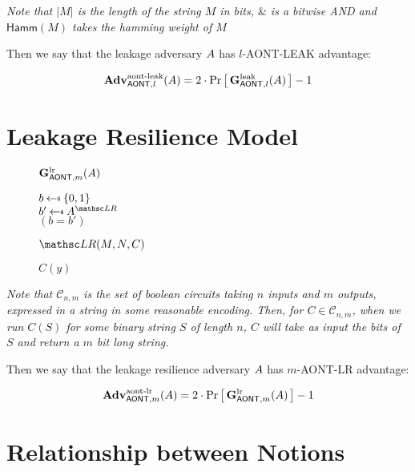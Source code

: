 \documentclass[11pt,twoside]{article}
\begin{document}
\emph{Note that $|M|$ is the length of the string $M$ in bits, $\mathrel{\&}$ is a bitwise AND and $\mathsf{Hamm}(M)$ takes the hamming weight of $M$}

Then we say that the leakage adversary $A$ has $l$-AONT-LEAK advantage: 

$$\textbf{Adv}^\text{aont-leak}_{\mathsf{AONT},l}(A)=2\cdot{\Pr\left[\,{\mathbf{G}_{\mathsf{AONT},l}^\text{leak}(A)}\,\right]} - 1$$

\section{Leakage Resilience Model} 

\begin{figure}[H]
{
\underline{$\mathbf{G}_{\mathsf{AONT},m}^\text{lr}(A)$}

\begin{algorithm}[H]
$b \getsr \bits$\\
$b' \getsr \advA^{\LRO}$\\
\Return $(b=b')$
\end{algorithm}

\smallskip
\underline{$\LRO(M,N,C)$}

\begin{algorithm}[H]
\Return $C(y)$
\end{algorithm}
}
\end{figure}

\emph{Note that $\mathcal{C}_{n,m}$ is the set of boolean circuits taking $n$ inputs and $m$ outputs, expressed in a string in some reasonable encoding. Then, for $C\in \mathcal{C}_{n,m}$, when we run $C(S)$ for some binary string $S$ of length $n$, $C$ will take as input the bits of $S$ and return a $m$ bit long string.}

Then we say that the leakage resilience adversary $A$ has $m$-AONT-LR advantage: 

$$\textbf{Adv}^\text{aont-lr}_{\mathsf{AONT},m}(A)=2\cdot{\Pr\left[\,{\mathbf{G}_{\mathsf{AONT},m}^\text{lr}(A)}\,\right]} - 1$$

\section{Relationship between Notions} 
\end{document}
